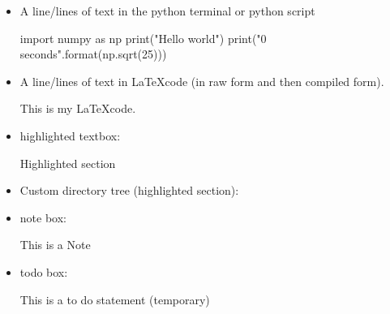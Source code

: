 \begin{itemize}
\item \begin{minipage}[t]{\textwidth} 
A line/lines of text in the python terminal or python script
\begin{latexbox}
\begin{pythonbox}
import numpy as np
print("Hello world")
print("{0} seconds".format(np.sqrt(25)))
\end{pythonbox}
\end{latexbox}
\end{minipage}


\item \begin{minipage}[t]{\textwidth} 
A line/lines of text in \LaTeX code (in raw form and then compiled form).
\begin{latexbox1}
\begin{latexbox}
This is my \LaTeX code.
\end{latexbox}
\end{latexbox1}
\end{minipage}

\item \begin{minipage}[t]{\textwidth} 
highlighted textbox:
\begin{latexbox}
\begin{thighlight}
Highlighted section
\end{thighlight}
\end{latexbox}
\end{minipage}


\item \begin{minipage}[t]{\textwidth} 
Custom directory tree (highlighted section):
\begin{latexbox}
\begin{tcustomdir}
\end{tcustomdir}
\end{latexbox}
\end{minipage}


\item \begin{minipage}[t]{\textwidth} 
note box:
\begin{latexbox}
\begin{note}
This is a Note
\end{note}
\end{latexbox}
\end{minipage}


\item \begin{minipage}[t]{\textwidth} 
todo box:
\begin{latexbox}
\begin{note}
This is a to do statement (temporary)
\end{note}
\end{latexbox}
\end{minipage}

\end{itemize}